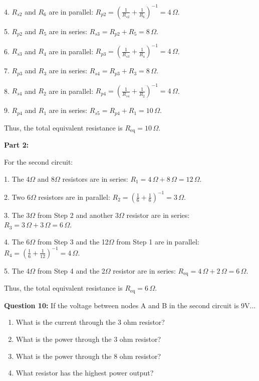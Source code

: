 \documentclass{article}
\begin{document}
4. \( R_{s2} \) and \( R_6 \) are in parallel:  
   \( R_{p2} = \left( \frac{1}{R_{s2}} + \frac{1}{R_6} \right)^{-1} = 4 \, \Omega \).

5. \( R_{p2} \) and \( R_5 \) are in series:  
   \( R_{s3} = R_{p2} + R_5 = 8 \, \Omega \).

6. \( R_{s3} \) and \( R_4 \) are in parallel:  
   \( R_{p3} = \left( \frac{1}{R_{s3}} + \frac{1}{R_4} \right)^{-1} = 4 \, \Omega \).

7. \( R_{p3} \) and \( R_3 \) are in series:  
   \( R_{s4} = R_{p3} + R_3 = 8 \, \Omega \).

8. \( R_{s4} \) and \( R_2 \) are in parallel:  
   \( R_{p4} = \left( \frac{1}{R_{s4}} + \frac{1}{R_2} \right)^{-1} = 4 \, \Omega \).

9. \( R_{p4} \) and \( R_1 \) are in series:  
   \( R_{s5} = R_{p4} + R_1 = 10 \, \Omega \).

Thus, the total equivalent resistance is \( R_{\text{eq}} = 10 \, \Omega \).

\bigskip

\textbf{Part 2:}

For the second circuit:

1. The 4$\Omega$ and 8$\Omega$ resistors are in series:  
   \( R_1 = 4 \, \Omega + 8 \, \Omega = 12 \, \Omega \).

2. Two 6$\Omega$ resistors are in parallel:  
   \( R_2 = \left( \frac{1}{6} + \frac{1}{6} \right)^{-1} = 3 \, \Omega \).

3. The 3$\Omega$ from Step 2 and another 3$\Omega$ resistor are in series:  
   \( R_3 = 3 \, \Omega + 3 \, \Omega = 6 \, \Omega \).

4. The 6$\Omega$ from Step 3 and the 12$\Omega$ from Step 1 are in parallel:  
   \( R_4 = \left( \frac{1}{6} + \frac{1}{12} \right)^{-1} = 4 \, \Omega \).

5. The 4$\Omega$ from Step 4 and the 2$\Omega$ resistor are in series:  
   \( R_{\text{eq}} = 4 \, \Omega + 2 \, \Omega = 6 \, \Omega \).

Thus, the total equivalent resistance is \( R_{\text{eq}} = 6 \, \Omega \).
\bigskip


\textbf{Question 10:} If the voltage between nodes A and B in the second circuit is 9V...
\begin{enumerate}
\item What is the current through the 3 ohm resistor?
\item What is the power through the 3 ohm resistor?
\item What is the power through the 8 ohm resistor?
\item What resistor has the highest power output?
\end{enumerate}
\end{document}
